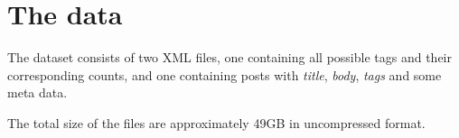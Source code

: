
\section{The data}

The dataset consists of two XML files, one containing all possible tags and their
corresponding counts, and one containing posts with \textit{title},
\textit{body}, \textit{tags} and some meta data.

The total size of the files are approximately 49GB in uncompressed format.
